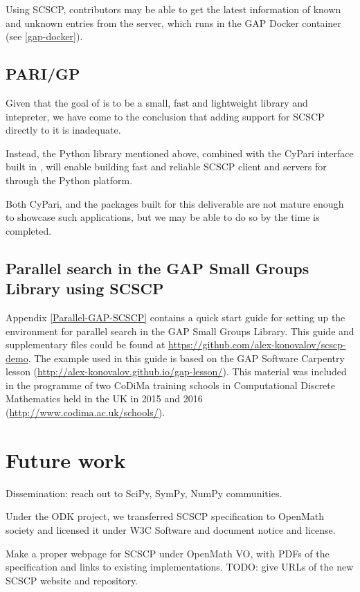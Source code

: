 \documentclass{deliverablereport}
\begin{document}
Using SCSCP, contributors may be able to get the latest information of 
known and unknown entries from the server, which runs in the GAP Docker 
container (see \ref{gap-docker}).


\subsection{PARI/GP}

Given that the goal of \Pari is to be a small, fast and lightweight
library and intepreter, we have come to the conclusion that adding
support for SCSCP directly to it is inadequate.

Instead, the Python library mentioned above, combined with the CyPari
interface built in , will enable
building fast and reliable SCSCP client and servers for \Pari through
the Python platform.

Both CyPari, and the packages built for this deliverable are not
mature enough to showcase such applications, but we may be able to do
so by the time  is completed.

\subsection{Parallel search in the GAP Small Groups Library using SCSCP}

Appendix \ref{Parallel-GAP-SCSCP} contains a quick start guide for setting
up the environment for parallel search in the GAP Small Groups Library. This
guide and supplementary files could be found at \url{https://github.com/alex-konovalov/scscp-demo}. The example used in this guide is based on the GAP Software Carpentry
lesson (\url{http://alex-konovalov.github.io/gap-lesson/}). This material was
included in the programme of two CoDiMa training schools in Computational
Discrete Mathematics held in the UK in 2015 and 2016
(\url{http://www.codima.ac.uk/schools/}).


\section{Future work}

Dissemination: reach out to SciPy, SymPy, NumPy communities.

Under the ODK project, we transferred SCSCP specification
to OpenMath society and licensed it under
W3C Software and document notice and license.

Make a proper webpage for SCSCP under OpenMath VO, with
PDFs of the specification and links to existing implementations.
TODO: give URLs of the new SCSCP website and repository.
\end{document}
